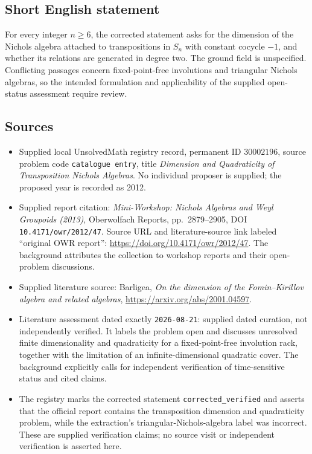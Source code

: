\documentclass[11pt]{article}
\begin{document}
\subsection{Short English statement}
For every integer \(n\geq6\), the corrected statement asks for the dimension of the Nichols algebra attached to transpositions in \(S_n\) with constant cocycle \(-1\), and whether its relations are generated in degree two. The ground field is unspecified. Conflicting passages concern fixed-point-free involutions and triangular Nichols algebras, so the intended formulation and applicability of the supplied open-status assessment require review.
\subsection{Sources}
\begin{itemize}
\item Supplied local UnsolvedMath registry record, permanent ID \(30002196\), source problem code \texttt{catalogue entry}, title \emph{Dimension and Quadraticity of Transposition Nichols Algebras}. No individual proposer is supplied; the proposed year is recorded as 2012.
\item Supplied report citation: \emph{Mini-Workshop: Nichols Algebras and Weyl Groupoids (2013)}, Oberwolfach Reports, pp.~2879--2905, DOI \texttt{10.4171/owr/2012/47}. Source URL and literature-source link labeled ``original OWR report'': \url{https://doi.org/10.4171/owr/2012/47}. The background attributes the collection to workshop reports and their open-problem discussions.
\item Supplied literature source: Barligea, \emph{On the dimension of the Fomin--Kirillov algebra and related algebras}, \url{https://arxiv.org/abs/2001.04597}.
\item Literature assessment dated exactly \texttt{2026-08-21}: supplied dated curation, not independently verified. It labels the problem open and discusses unresolved finite dimensionality and quadraticity for a fixed-point-free involution rack, together with the limitation of an infinite-dimensional quadratic cover. The background explicitly calls for independent verification of time-sensitive status and cited claims.
\item The registry marks the corrected statement \texttt{corrected\_verified} and asserts that the official report contains the transposition dimension and quadraticity problem, while the extraction's triangular-Nichols-algebra label was incorrect. These are supplied verification claims; no source visit or independent verification is asserted here.
\end{itemize}
\end{document}

